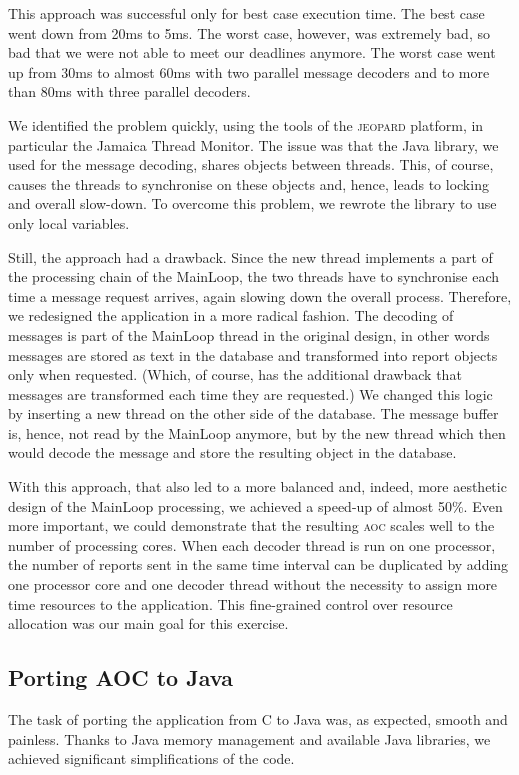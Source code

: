 \documentclass{sig-alternate}
\newcommand{\acronym}[1]{\textsc{#1}}
\begin{document}
This approach was successful only for best case execution time.
The best case went down from 20ms to 5ms. 
The worst case, however, was extremely bad,
so bad that we were not able to meet our deadlines anymore.
The worst case went up from 30ms to almost 60ms with two
parallel message decoders and to more than 80ms with three
parallel decoders.

We identified the problem quickly, using the tools
of the \acronym{jeopard} platform, in particular the 
Jamaica Thread Monitor.
The issue was that the Java library, we used for the message decoding,
shares objects between threads.
This, of course, causes the threads to synchronise
on these objects and, hence, leads to locking and overall slow-down.
To overcome this problem, 
we rewrote the library to use only local variables.

Still, the approach had a drawback.
Since the new thread implements a part of the processing chain
of the MainLoop, the two threads have to synchronise
each time a message request arrives, again slowing down
the overall process. 
Therefore, we redesigned the application in a more radical fashion.
The decoding of messages is part of the MainLoop thread
in the original design, in other words
messages are stored as text in the database
and transformed into report objects only when requested.
(Which, of course, has the additional drawback
that messages are transformed each time they are requested.)
We changed this logic by inserting a new thread 
on the other side of the database. 
The message buffer is, hence, not read by the MainLoop anymore,
but by the new thread which then would decode the message
and store the resulting object in the database.

With this approach, that also led to a more balanced and,
indeed, more aesthetic design of the MainLoop processing,
we achieved a speed-up of almost 50\%. Even more important,
we could demonstrate that the resulting \acronym{aoc}
scales well to the number of processing cores.
When each decoder thread is run on one processor,
the number of reports sent in the same time interval
can be duplicated by adding one processor core 
and one decoder thread without the necessity to assign
more time resources to the application. 
This fine-grained control over 
resource allocation was our main goal for this exercise. 

\subsection{Porting AOC to Java}
The task of porting the application from C to Java
was, as expected, smooth and painless.
Thanks to Java memory management and
available Java libraries,
we achieved significant simplifications of the code.
\end{document}
